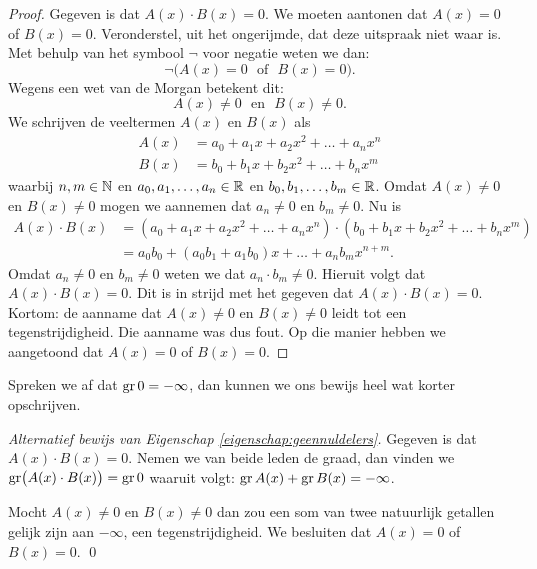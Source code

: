 \documentclass{ximera}
\begin{document}
\begin{proof}

Gegeven is dat $A(x)\cdot B(x) = 0$. We moeten aantonen dat $A(x) = 0$ of $B(x) = 0$. Veronderstel, uit het ongerijmde, dat deze uitspraak niet waar is. Met behulp van het symbool $\neg$ voor 
negatie weten we dan:
\[
\neg\bigl(A(x) = 0 \,\, \text{ of } \,\, B(x) = 0\bigr).
\]
Wegens een wet van de Morgan betekent dit:
\[
A(x) \neq 0 \,\, \text{ en } \,\, B(x) \neq 0.
\] 
We schrijven de veeltermen $A(x)$ en $B(x)$ als
\begin{align*}
A(x) & = a_0 + a_1 x + a_2 x^2 + \dots + a_n x^n \\
B(x) & = b_0 + b_1 x + b_2 x^2 + \dots + b_n x^m
\end{align*}
waarbij $n,m \in \mathbb{N}$ en $a_0, a_1, \ldots, a_n \in \mathbb{R}$ en $b_0, b_1, \ldots, b_m \in \mathbb{R}$. Omdat $A(x) \neq 0$ en $B(x) \neq 0$ mogen we aannemen dat $a_n \neq 0$ en $b_m \neq 0$. Nu is
\begin{align*}
A(x) \cdot B(x) 
& = \left(a_0 + a_1 x + a_2 x^2 + \dots + a_n x^n\right) \cdot \left( b_0 + b_1 x + b_2 x^2 + \dots + b_n x^m\right) \\
& = a_0b_0 + (a_0b_1 + a_1b_0)x + \dots + a_n b_m x^{n+m}.
\end{align*}
Omdat $a_n \neq 0$ en $b_m \neq 0$ weten we dat $a_n \cdot b_m \neq 0$. Hieruit volgt dat $A(x) \cdot B(x) = 0$. Dit is in strijd met het gegeven dat $A(x)\cdot B(x) = 0$. Kortom: de aanname dat $A(x) \neq 0$ en $B(x) \neq 0$ leidt tot een tegenstrijdigheid. Die aanname was dus fout. Op die manier hebben we aangetoond dat $A(x) = 0$ of $B(x) = 0$. 

\end{proof}


\begin{Uitbreiding}
Spreken we af dat $\operatorname{gr} 0 = - \infty$, dan kunnen we ons bewijs heel wat korter opschrijven. 

{\em Alternatief bewijs van Eigenschap \ref{eigenschap:geennuldelers}.}
Gegeven is dat $A(x)\cdot B(x) = 0$. Nemen we van beide leden de graad, dan vinden we $\operatorname{gr}\bigl( A(x)\cdot B(x) \bigr) = \operatorname{gr} 0$ waaruit volgt: $\operatorname{gr} A(x) + \operatorname{gr} B(x) = - \infty$.

Mocht $A(x) \neq 0$ en $B(x) \neq 0$ dan zou een som van twee natuurlijk getallen gelijk zijn aan $-\infty$, een tegenstrijdigheid. We besluiten dat $A(x) = 0$ of $B(x) = 0$.
\qed
\end{Uitbreiding}
\end{document}
